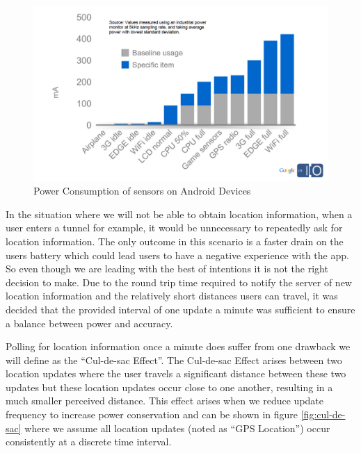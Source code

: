 \begin{figure}[h]
  \centering
  \includegraphics[width=\textwidth]{images/power.png}
  \caption{Power Consumption of sensors on Android Devices \cite{android_efficiencySlides}}
  \label{fig:power}
\end{figure}

In the situation where we will not be able to obtain location
information, when a user enters a tunnel for example, it would be
unnecessary to repeatedly ask for location information. The only
outcome in this scenario is a faster drain on the users battery which
could lead users to have a negative experience with the app. So even
though we are leading with the best of intentions it is not the right
decision to make. Due to the round trip time required to notify the
server of new location information and the relatively short distances
users can travel, it was decided that the provided interval of one
update a minute was sufficient to ensure a balance between power and
accuracy. 

Polling for location information once a minute does suffer from one
drawback we will define as the ``Cul-de-sac Effect''. The Cul-de-sac
Effect arises between two location updates where the user travels a
significant distance between these two updates but these location
updates occur close to one another, resulting in a much smaller
perceived distance. This effect arises when we reduce update
frequency to increase power conservation and can be shown in figure 
\ref{fig:cul-de-sac} where we assume all location updates (noted as
``GPS Location'') occur consistently at a discrete time interval. 

